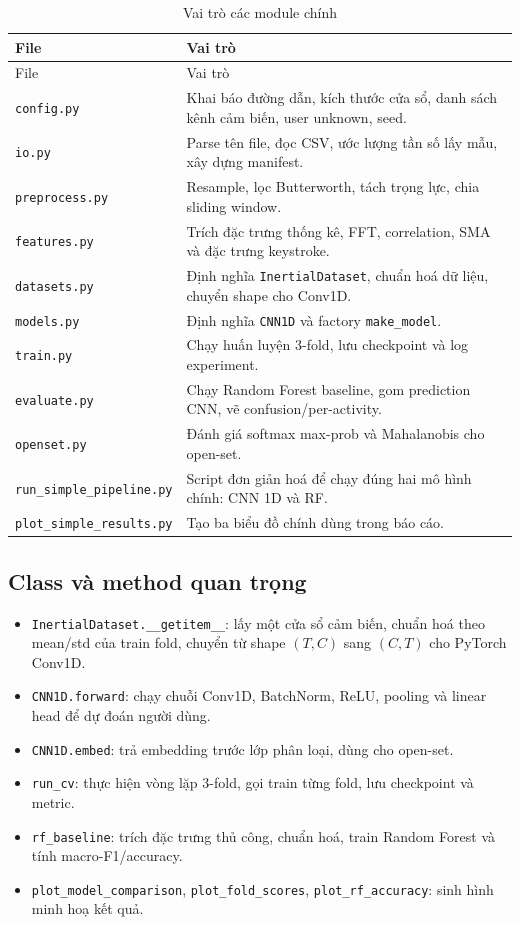 \documentclass[12pt,a4paper]{article}
\begin{document}
\begin{longtable}{P{0.34\textwidth}P{0.56\textwidth}}
\caption{Vai trò các module chính} \\
\toprule
File & Vai trò \\
\midrule
\endfirsthead
\toprule
File & Vai trò \\
\midrule
\endhead
\texttt{config.py} & Khai báo đường dẫn, kích thước cửa sổ, danh sách kênh cảm biến, user unknown, seed. \\
\texttt{io.py} & Parse tên file, đọc CSV, ước lượng tần số lấy mẫu, xây dựng manifest. \\
\texttt{preprocess.py} & Resample, lọc Butterworth, tách trọng lực, chia sliding window. \\
\texttt{features.py} & Trích đặc trưng thống kê, FFT, correlation, SMA và đặc trưng keystroke. \\
\texttt{datasets.py} & Định nghĩa \texttt{InertialDataset}, chuẩn hoá dữ liệu, chuyển shape cho Conv1D. \\
\texttt{models.py} & Định nghĩa \texttt{CNN1D} và factory \texttt{make\_model}. \\
\texttt{train.py} & Chạy huấn luyện 3-fold, lưu checkpoint và log experiment. \\
\texttt{evaluate.py} & Chạy Random Forest baseline, gom prediction CNN, vẽ confusion/per-activity. \\
\texttt{openset.py} & Đánh giá softmax max-prob và Mahalanobis cho open-set. \\
\texttt{run\_simple\_pipeline.py} & Script đơn giản hoá để chạy đúng hai mô hình chính: CNN 1D và RF. \\
\texttt{plot\_simple\_results.py} & Tạo ba biểu đồ chính dùng trong báo cáo. \\
\bottomrule
\end{longtable}

\subsection{Class và method quan trọng}

\begin{itemize}
    \item \texttt{InertialDataset.\_\_getitem\_\_}: lấy một cửa sổ cảm biến, chuẩn hoá theo mean/std của train fold, chuyển từ shape \((T, C)\) sang \((C, T)\) cho PyTorch Conv1D.
    \item \texttt{CNN1D.forward}: chạy chuỗi Conv1D, BatchNorm, ReLU, pooling và linear head để dự đoán người dùng.
    \item \texttt{CNN1D.embed}: trả embedding trước lớp phân loại, dùng cho open-set.
    \item \texttt{run\_cv}: thực hiện vòng lặp 3-fold, gọi train từng fold, lưu checkpoint và metric.
    \item \texttt{rf\_baseline}: trích đặc trưng thủ công, chuẩn hoá, train Random Forest và tính macro-F1/accuracy.
    \item \texttt{plot\_model\_comparison}, \texttt{plot\_fold\_scores}, \texttt{plot\_rf\_accuracy}: sinh hình minh hoạ kết quả.
\end{itemize}
\end{document}

